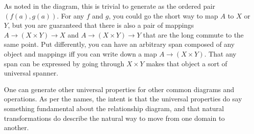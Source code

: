 \documentclass[11pt]{article}
\begin{document}
As noted in the diagram, this is trivial to generate as the ordered pair $(f(a), g(a))$.
For any $f$ and $g$, you could go the short way to map $A$ to $X$ or $Y$, but you are
guaranteed that there is also a pair of mappings $A\to (X\times Y) \to X$ and $A\to
(X\times Y) \to Y$ that are
the long commute to the same point.  Put differently, you can have an arbitrary
span composed of any object and mappings iff you can write down a map $A\to (X\times
Y)$. That any span can be expressed by going through $X\times Y$ makes that object a
sort of universal spanner.

One can generate other universal properties for other common diagrams and operations.
As per the names, the intent is that the universal properties do say something fundamental
about the relationship diagram, and that natural transformations do describe the
natural way to move from one domain to another.

\nocite{awodey:category}
\nocite{riehl:category}


\end{document}
